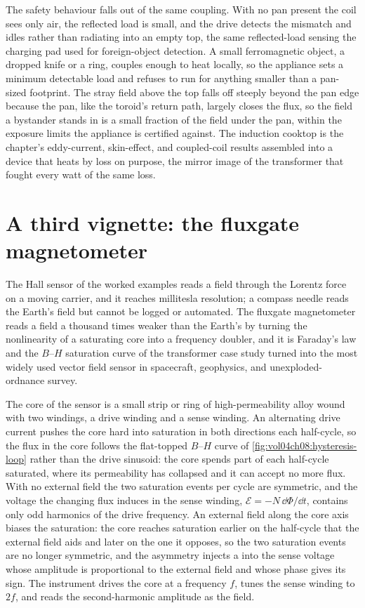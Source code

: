 The safety behaviour falls out of the same coupling. With no pan present the
coil sees only air, the reflected load is small, and the drive detects the
mismatch and idles rather than radiating into an empty top, the same
reflected-load sensing the charging pad used for foreign-object detection.
A small ferromagnetic object, a dropped knife or a ring, couples enough to
heat locally, so the appliance sets a minimum detectable load and refuses
to run for anything smaller than a pan-sized footprint. The stray field
above the top falls off steeply beyond the pan edge because the pan, like
the toroid's return path, largely closes the flux, so the field a bystander
stands in is a small fraction of the field under the pan, within the
exposure limits the appliance is certified against. The induction cooktop
is the chapter's eddy-current, skin-effect, and coupled-coil results
assembled into a device that heats by loss on purpose, the mirror image of
the transformer that fought every watt of the same loss.

\section{A third vignette: the fluxgate magnetometer}

The Hall sensor of the worked examples reads a field through the Lorentz
force on a moving carrier, and it reaches millitesla resolution; a compass
needle reads the Earth's field but cannot be logged or automated. The
fluxgate magnetometer reads a field a thousand times weaker than the Earth's
by turning the nonlinearity of a saturating core into a frequency doubler,
and it is Faraday's law and the $B$--$H$ saturation curve of the transformer
case study turned into the most widely used vector field sensor in
spacecraft, geophysics, and unexploded-ordnance survey.

The core of the sensor is a small strip or ring of high-permeability alloy
wound with two windings, a drive winding and a sense winding. An
alternating drive current pushes the core hard into saturation in both
directions each half-cycle, so the flux in the core follows the flat-topped
$B$--$H$ curve of \cref{fig:vol04ch08:hysteresis-loop} rather than the drive
sinusoid: the core spends part of each half-cycle saturated, where its
permeability has collapsed and it can accept no more flux. With no external
field the two saturation events per cycle are symmetric, and the voltage the
changing flux induces in the sense winding, $\mathcal{E} = -N\,\dd\Phi/\dd
t$, contains only odd harmonics of the drive frequency. An external field
along the core axis biases the saturation: the core reaches saturation
earlier on the half-cycle that the external field aids and later on the one
it opposes, so the two saturation events are no longer symmetric, and the
asymmetry injects a  into the sense voltage whose
amplitude is proportional to the external field and whose phase gives its
sign. The instrument drives the core at a frequency $f$, tunes the sense
winding to $2f$, and reads the second-harmonic amplitude as the field.

